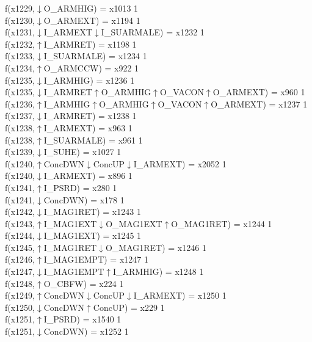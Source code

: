 f(x1229,$\downarrow$O\_ARMHIG) = x1013 {1} \\
f(x1230,$\downarrow$O\_ARMEXT) = x1194 {1} \\
f(x1231,$\downarrow$I\_ARMEXT$\downarrow$I\_SUARMALE) = x1232 {1} \\
f(x1232,$\uparrow$I\_ARMRET) = x1198 {1} \\
f(x1233,$\downarrow$I\_SUARMALE) = x1234 {1} \\
f(x1234,$\uparrow$O\_ARMCCW) = x922 {1} \\
f(x1235,$\downarrow$I\_ARMHIG) = x1236 {1} \\
f(x1235,$\downarrow$I\_ARMRET$\uparrow$O\_ARMHIG$\uparrow$O\_VACON$\uparrow$O\_ARMEXT) = x960 {1} \\
f(x1236,$\uparrow$I\_ARMHIG$\uparrow$O\_ARMHIG$\uparrow$O\_VACON$\uparrow$O\_ARMEXT) = x1237 {1} \\
f(x1237,$\downarrow$I\_ARMRET) = x1238 {1} \\
f(x1238,$\uparrow$I\_ARMEXT) = x963 {1} \\
f(x1238,$\uparrow$I\_SUARMALE) = x961 {1} \\
f(x1239,$\downarrow$I\_SUHE) = x1027 {1} \\
f(x1240,$\uparrow$ConcDWN$\downarrow$ConcUP$\downarrow$I\_ARMEXT) = x2052 {1} \\
f(x1240,$\downarrow$I\_ARMEXT) = x896 {1} \\
f(x1241,$\uparrow$I\_PSRD) = x280 {1} \\
f(x1241,$\downarrow$ConcDWN) = x178 {1} \\
f(x1242,$\downarrow$I\_MAG1RET) = x1243 {1} \\
f(x1243,$\uparrow$I\_MAG1EXT$\downarrow$O\_MAG1EXT$\uparrow$O\_MAG1RET) = x1244 {1} \\
f(x1244,$\downarrow$I\_MAG1EXT) = x1245 {1} \\
f(x1245,$\uparrow$I\_MAG1RET$\downarrow$O\_MAG1RET) = x1246 {1} \\
f(x1246,$\uparrow$I\_MAG1EMPT) = x1247 {1} \\
f(x1247,$\downarrow$I\_MAG1EMPT$\uparrow$I\_ARMHIG) = x1248 {1} \\
f(x1248,$\uparrow$O\_CBFW) = x224 {1} \\
f(x1249,$\uparrow$ConcDWN$\downarrow$ConcUP$\downarrow$I\_ARMEXT) = x1250 {1} \\
f(x1250,$\downarrow$ConcDWN$\uparrow$ConcUP) = x229 {1} \\
f(x1251,$\uparrow$I\_PSRD) = x1540 {1} \\
f(x1251,$\downarrow$ConcDWN) = x1252 {1} \\
